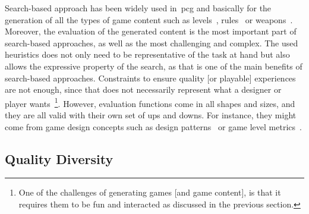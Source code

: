 Search-based approach has been widely used in~\acrshort{pcg} and basically for the generation of all the types of game content such as levels~\cite{dormans_generating_2011}, rules~\cite{font_towards_2013} or weapons~\cite{gravina_surprise_2016}. Moreover, the evaluation of the generated content is the most important part of search-based approaches, as well as the most challenging and complex. The used heuristics does not only need to be representative of the task at hand but also allows the expressive property of the search, as that is one of the main benefits of search-based approaches. Constraints to ensure quality [or playable] experiences are not enough, since that does not necessarily represent what a designer or player wants~\footnote{One of the challenges of generating games [and game content], is that it requires them to be fun and interacted as discussed in the previous section.}. However, evaluation functions come in all shapes and sizes, and they are all valid with their own set of ups and downs. For instance, they might come from game design concepts such as design patterns~\cite{dahlskog_patterns_2015} or game level metrics~\cite{canossa_towards_2015,marino_empirical_2015}. 




\subsection{Quality Diversity} \label{sec:Backqd}

